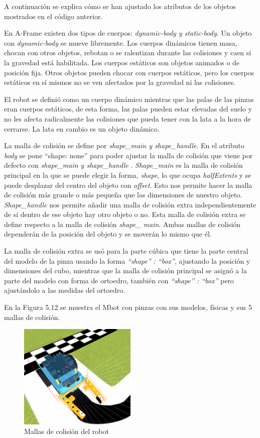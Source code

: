 A continuación se explica cómo se han ajustado los atributos de los objetos mostrados en el código anterior.

En A-Frame existen dos tipos de cuerpos: \textit{dynamic-body y static-body}. Un objeto con \textit{dynamic-body}  se mueve libremente. Los cuerpos dinámicos tienen masa, chocan con otros objetos, rebotan o se ralentizan durante las colisiones y caen si la gravedad está habilitada.
Los cuerpos estáticos son objetos animados o de posición fija. Otros objetos pueden chocar con cuerpos estáticos, pero los cuerpos estáticos en sí mismos no se ven afectados por la gravedad ni las colisiones.

El robot se definió como un cuerpo dinámico mientras que las palas de las pinzas eran cuerpos estáticos, de esta forma, las palas pueden estar elevadas del suelo y no les afecta  radicalmente las colisiones que pueda tener con la lata a la hora de cerrarse. La lata en cambio es un objeto dinámico.

La malla de colisión se define por \textit{shape\_main y shape\_handle}. En el atributo \textit{body} se pone ``shape: none'' para poder ajustar la malla de colisión que viene por defecto con \textit{shape\_main y shape\_handle} .
\textit{Shape\_main} es la malla de colisión principal en la que se puede elegir la forma, \textit{shape}, lo que ocupa \textit{halfExtents} y se puede desplazar del centro del objeto con \textit{offset}. Esto nos permite hacer la malla de colisión más grande o más pequeña que las dimensiones de nuestro objeto. \textit{ Shape\_handle} nos permite añadir una malla de colisión extra independientemente de si dentro de ese  objeto hay otro objeto o no. Esta malla de colisión extra se define respecto a la malla de colisión \textit{shape\_ main}. Ambas mallas de colisión dependerán de la posición del objeto y se moverán lo mismo que él.

La malla de colisión extra se usó para la parte cúbica que tiene la parte central del modelo de la pinza usando la forma  \textit{ ``shape'' : ``box''},  ajustando  la posición y dimensiones del cubo, mientras que la malla de colisión principal se asignó a la parte del modelo con forma de ortoedro, también con \textit{ ``shape'' : ``box''} pero ajustándolo a las medidas del ortoedro.

En la Figura  5.12 se muestra el Mbot con pinzas con sus modelos, físicas y sus 5 mallas de colisión.

 \begin{figure}[H]
  \centering
 \includegraphics[width=0.5\textwidth, height=0.4\textwidth]{chapters/images/mallas.png}
  \caption{Mallas de colisión del robot}
\end{figure}

